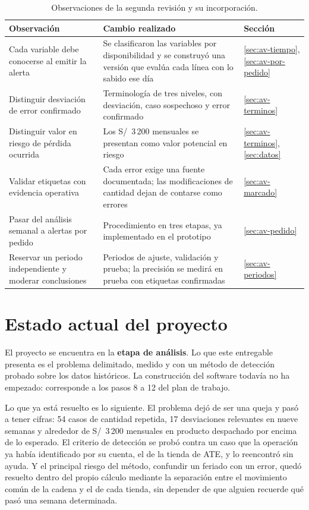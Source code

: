 \begin{table}[htbp]
\centering
\caption{Observaciones de la segunda revisión y su incorporación.}
\label{tab:av-retro}
\small
\begin{tabularx}{\textwidth}{@{}L{4.8cm}YL{1.6cm}@{}}
\toprule
\textbf{Observación} & \textbf{Cambio realizado} & \textbf{Sección} \\
\midrule
Cada variable debe conocerse al emitir la alerta & Se clasificaron las variables por disponibilidad y se construyó una versión que evalúa cada línea con lo sabido ese día & \ref{sec:av-tiempo}, \ref{sec:av-por-pedido} \\
Distinguir desviación de error confirmado & Terminología de tres niveles, con desviación, caso sospechoso y error confirmado & \ref{sec:av-terminos} \\
Distinguir valor en riesgo de pérdida ocurrida & Los S/~3\,200 mensuales se presentan como valor potencial en riesgo & \ref{sec:av-terminos}, \ref{sec:datos} \\
Validar etiquetas con evidencia operativa & Cada error exige una fuente documentada; las modificaciones de cantidad dejan de contarse como errores & \ref{sec:av-marcado} \\
Pasar del análisis semanal a alertas por pedido & Procedimiento en tres etapas, ya implementado en el prototipo & \ref{sec:av-pedido} \\
Reservar un periodo independiente y moderar conclusiones & Periodos de ajuste, validación y prueba; la precisión se medirá en prueba con etiquetas confirmadas & \ref{sec:av-periodos} \\
\bottomrule
\end{tabularx}
\end{table}
\else
\section{Estado actual del proyecto}
\label{sec:estado-e1}

El proyecto se encuentra en la \textbf{etapa de análisis}. Lo que este entregable presenta es el problema delimitado, medido y con un método de detección probado sobre los datos históricos. La construcción del software todavía no ha empezado: corresponde a los pasos 8 a 12 del plan de trabajo.

Lo que ya está resuelto es lo siguiente. El problema dejó de ser una queja y pasó a tener cifras: 54 casos de cantidad repetida, 17 desviaciones relevantes en nueve semanas y alrededor de S/~3\,200 mensuales en producto despachado por encima de lo esperado. El criterio de detección se probó contra un caso que la operación ya había identificado por su cuenta, el de la tienda de ATE, y lo reencontró sin ayuda. Y el principal riesgo del método, confundir un feriado con un error, quedó resuelto dentro del propio cálculo mediante la separación entre el movimiento común de la cadena y el de cada tienda, sin depender de que alguien recuerde qué pasó una semana determinada.

